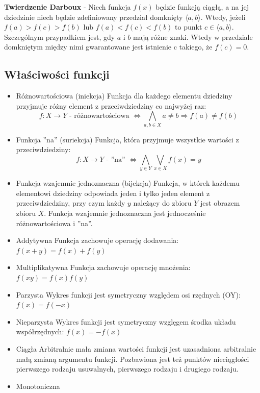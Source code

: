 \documentclass[14pt,a4paper]{extarticle}
\begin{document}
\noindent\textbf{Twierdzenie Darboux} - Niech funkcja $f(x)$ będzie funkcją ciągłą, a na jej dziedzinie
niech będzie zdefiniowany przedział domknięty $\langle a, b\rangle $. Wtedy, jeżeli $f(a) > f(c) > f(b)$ lub
$f(a) < f(c) < f(b)$ to punkt $c \in \langle a, b\rangle$. Szczególnym przypadkiem jest, gdy $a$ i $b$ mają różne
znaki. Wtedy w przedziale domkniętym między nimi gwarantowane jest istnienie c takiego, że $f(c) = 0$.

\subsection{Właściwości funkcji}
\begin{itemize}
   \item Różnowartościowa (iniekcja)\hfill\break
      Funkcja dla każdego elementu dziedziny przyjmuje różny element z przeciwdziedziny co najwyżej raz:
      $$f:X \rightarrow Y \text{ - różnowartościowa } \Leftrightarrow \underset{a, b \in X}{\bigwedge} a \neq b \Rightarrow f(a) \neq f(b)$$
   \item Funkcja ''na'' (suriekcja)\hfill\break
      Funkcja, która przyjmuje wszystkie wartości z przeciwdziedziny:
      $$f:X \rightarrow Y \text{ - ''na'' } \Leftrightarrow \underset{y \in Y}{\bigwedge} \underset{x \in X}{\bigvee} f(x) = y$$
   \item Funkcja wzajemnie jednoznaczna (bijekcja)\hfill\break
      Funkcja, w którek każdemu elementowi dziedziny odpowiada jeden i tylko jeden element z przeciwdziedziny,
      przy czym każdy $y$ należący do zbioru $Y$ jest obrazem zbioru $X$.
      Funkcja wzajemnie jednoznaczna jest jednocześnie różnowartościowa i ''na''.
   \item Addytywna\hfill\break
      Funkcja zachowuje operację dodawania: $f(x + y) = f(x) + f(y)$
   \item Multiplikatywna\hfill\break
      Funkcja zachowuje operację mnożenia: $f(xy) = f(x)f(y)$
   \item Parzysta\hfill\break
      Wykres funkcji jest symetryczny względem osi rzędnych (OY): $f(x) = f(-x)$
   \item Nieparzysta\hfill\break
      Wykres funkcji jest symetryczny wzglęgem środka układu współrzędnych: $f(x) = -f(x)$
   \item Ciągła\hfill\break
      Arbitralnie mała zmiana wartości funkcji jest uzasadniona arbitralnie małą zmianą argumentu funkcji.
      Pozbawiona jest też punktów nieciągłości pierwszego rodzaju usuwalnych, pierwszego rodzaju i drugiego rodzaju.
   \item Monotoniczna\hfill\break

\end{itemize}
\end{document}
